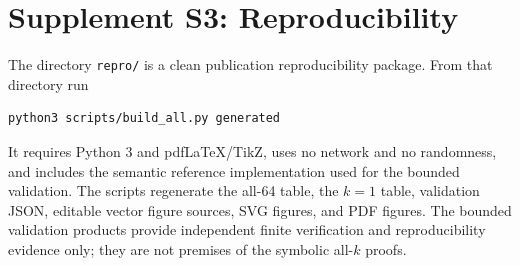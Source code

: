 \documentclass[11pt]{article}
\begin{document}
\section*{Supplement S3: Reproducibility}
The directory \texttt{repro/} is a clean publication reproducibility package. From that directory run
\begin{verbatim}
python3 scripts/build_all.py generated
\end{verbatim}
It requires Python 3 and pdfLaTeX/TikZ, uses no network and no randomness, and includes the semantic reference implementation used for the bounded validation. The scripts regenerate the all-64 table, the $k=1$ table, validation JSON, editable vector figure sources, SVG figures, and PDF figures.
The bounded validation products provide independent finite verification and reproducibility evidence only; they are not premises of the symbolic all-$k$ proofs.
\end{document}
